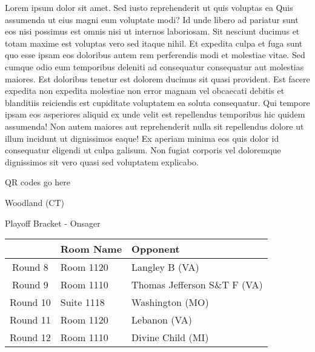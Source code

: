 \documentclass{article}%
\begin{document}
\vspace*{8pt}%
\linebreak%
\newline%
\newline%
Lorem ipsum dolor sit amet. Sed iusto reprehenderit ut quis voluptas ea Quis assumenda ut eius magni eum voluptate modi? Id unde libero ad pariatur sunt eos nisi possimus est omnis nisi ut internos laboriosam. Sit nesciunt ducimus et totam maxime est voluptas vero sed itaque nihil. Et expedita culpa et fuga sunt quo esse ipsam eos doloribus autem rem perferendis modi et molestiae vitae.\newline%
\newline%
Sed cumque odio eum temporibus deleniti ad consequatur consequatur aut molestias maiores. Est doloribus tenetur est dolorem ducimus sit quasi provident. Est facere expedita non expedita molestiae non error magnam vel obcaecati debitis et blanditiis reiciendis est cupiditate voluptatem ea soluta consequatur. Qui tempore ipsam eos asperiores aliquid ex unde velit est repellendus temporibus hic quidem assumenda!\newline%
\newline%
Non autem maiores aut reprehenderit nulla sit repellendus dolore ut illum incidunt ut dignissimos eaque! Ex aperiam minima eos quis dolor id consequatur eligendi ut culpa galisum. Non fugiat corporis vel doloremque dignissimos sit vero quasi sed voluptatem explicabo.\newline%
\newline%
%
\vspace*{30pt}%
\begin{center}%
\begin{Huge}%
QR codes go here%
\end{Huge}%
\end{center}%
\newpage%
\begin{center}%
\begin{Huge}%
Woodland (CT)%
\end{Huge}%
\vspace*{8pt}%
\linebreak%
\begin{Large}%
Playoff Bracket {-} Onsager%
\end{Large}%
\end{center}%
%
\begin{tabularx}{\textwidth}{|c|Y|Y|}%
\hline%
&Room Name&Opponent\\%
\hline%
Round 8&Room 1120&Langley B (VA)\\%
Round 9&Room 1110&Thomas Jefferson S\&T F (VA)\\%
Round 10&Suite 1118&Washington (MO)\\%
Round 11&Room 1120&Lebanon (VA)\\%
Round 12&Room 1110&Divine Child (MI)\\%
\hline%
\end{tabularx}%
\end{document}
